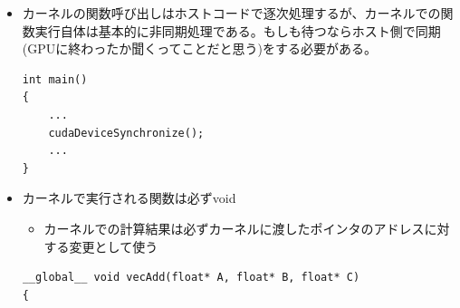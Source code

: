 \documentclass[12pt,a4paper,uplatex]{jsarticle}
\begin{document}
\begin{itemize}
  \begin{itemize}
    \item あるスレッドブロック内のスレッドは共有メモリを介してデータのやり取りが可能
    \item communicateやsynchronizeが有利
    \item 逆に、異なるスレッドブロックの間のデータのやり取りはオーバーヘッドが大きいことに注意すべし
  \end{itemize}
  \item カーネルの関数呼び出しはホストコードで逐次処理するが、カーネルでの関数実行自体は基本的に非同期処理である。もしも待つならホスト側で同期(GPUに終わったか聞くってことだと思う)をする必要がある。
  \begin{lstlisting}[caption= host and kernel synchronize, label=hostAndKernelSynchronize]
int main()
{
    ...
    cudaDeviceSynchronize();
    ...
}
  \end{lstlisting}
  \item カーネルで実行される関数は必ずvoid
  \begin{itemize}
    \item カーネルでの計算結果は必ずカーネルに渡したポインタのアドレスに対する変更として使う
  \end{itemize}
  \begin{lstlisting}[caption=Kernel function,label=kernelFunction]
__global__ void vecAdd(float* A, float* B, float* C)
{


\end{lstlisting}
\end{itemize}
\end{document}
